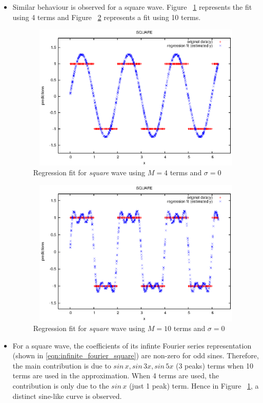 \documentclass[a4paper,12pt]{article}
\begin{document}
\begin{itemize}
\item Similar behaviour is observed for a square wave. Figure ~\ref{fig:fit_square_4_terms_sigma_0} represents the fit using 4 terms and Figure ~\ref{fig:fit_square_10_terms_sigma_0} represents a fit using 10 terms.
\begin{figure}[htpb]
  \begin{center}
    \includegraphics*[width=12cm,height=7cm]{./images/fit_square_4_terms_sigma_0.eps}
    \caption {Regression fit for \textit{square} wave using $M = 4$ terms and $\sigma = 0$}
    \label{fig:fit_square_4_terms_sigma_0}
  \end{center}
\end{figure}

\begin{figure}[htpb]
  \begin{center}
    \includegraphics*[width=12cm,height=7cm]{./images/fit_square_10_terms_sigma_0.eps}
    \caption {Regression fit for \textit{square} wave using $M = 10$ terms and $\sigma = 0$}
    \label{fig:fit_square_10_terms_sigma_0}
  \end{center}
\end{figure}

\item For a square wave, the coefficients of its infinte Fourier series representation (shown in \eqref{eqn:infinite_fourier_square}) are non-zero for odd sines. Therefore, the main contribution is due to $sin\,x,sin\,3x,sin\,5x$ (3 peaks) terms when 10 terms are used in the approximation. When 4 terms are used, the contribution is only due to the $sin\,x$ (just 1 peak) term. Hence in Figure ~\ref{fig:fit_square_4_terms_sigma_0}, a distinct sine-like curve is observed.
\end{itemize}
\end{document}
